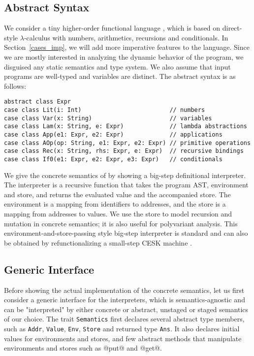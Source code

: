 \subsection{Abstract Syntax} \label{bg_lang}

We consider a tiny higher-order functional language \TLang, which is based on
direct-style $\lambda$-calculus with numbers, arithmetics, recursions and
conditionals. In Section~\ref{cases_imp}, we will add more imperative features
to the language. Since we are mostly interested in analyzing the dynamic
behavior of the program, we disguised any static semantics and type system. We
also assume that input programs are well-typed and variables are distinct. The
abstract syntax is as follows:

\begin{lstlisting}
abstract class Expr
case class Lit(i: Int)                         // numbers
case class Var(x: String)                      // variables
case class Lam(x: String, e: Expr)             // lambda abstractions
case class App(e1: Expr, e2: Expr)             // applications
case class AOp(op: String, e1: Expr, e2: Expr) // primitive operations
case class Rec(x: String, rhs: Expr, e: Expr)  // recursive bindings
case class If0(e1: Expr, e2: Expr, e3: Expr)   // conditionals
\end{lstlisting}

We give the concrete semantics of \TLang by showing a big-step definitional
interpreter. The interpreter is a recursive function that takes the program AST,
environment and store, and returns the evaluated value and the accompanied
store. The environment is a mapping from identifiers to addresses, and the store
is a mapping from addresses to values. We use the store to model recursion and
mutation in concrete semantics; it is also useful for polyvariant analysis. This
environment-and-store-passing style big-step interpreter is standard and can
also be obtained by refunctionalizing \cite{DBLP:conf/ppdp/AgerBDM03,
Wei:2018:RAA:3243631.3236800} a small-step CESK machine
\cite{DBLP:conf/popl/FelleisenF87}.

\subsection{Generic Interface}

Before showing the actual implementation of the concrete semantics, let us first
consider a generic interface for the interpreters, which is semantics-agnostic
and can be "interpreted" by either concrete or abstract, unstaged or staged
semantics of our choice. The trait \texttt{Semantics} first declares several
abstract type members, such as \texttt{Addr}, \texttt{Value}, \texttt{Env},
\texttt{Store} and returned type \texttt{Ans}. It also declares initial values
for environments and stores, and few abstract methods that manipulate
environments and stores such as @put@ and @get@.

